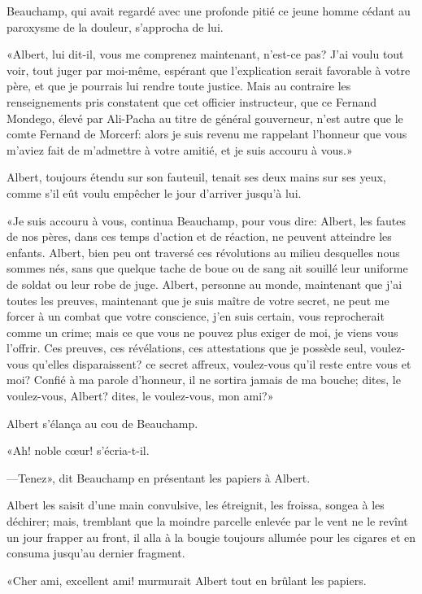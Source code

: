 Beauchamp, qui avait regardé avec une profonde pitié ce jeune homme cédant au paroxysme de la douleur, s'approcha de lui. 

«Albert, lui dit-il, vous me comprenez maintenant, n'est-ce pas? J'ai voulu tout voir, tout juger par moi-même, espérant que l'explication serait favorable à votre père, et que je pourrais lui rendre toute justice. Mais au contraire les renseignements pris constatent que cet officier instructeur, que ce Fernand Mondego, élevé par Ali-Pacha au titre de général gouverneur, n'est autre que le comte Fernand de Morcerf: alors je suis revenu me rappelant l'honneur que vous m'aviez fait de m'admettre à votre amitié, et je suis accouru à vous.» 

Albert, toujours étendu sur son fauteuil, tenait ses deux mains sur ses yeux, comme s'il eût voulu empêcher le jour d'arriver jusqu'à lui. 

«Je suis accouru à vous, continua Beauchamp, pour vous dire: Albert, les fautes de nos pères, dans ces temps d'action et de réaction, ne peuvent atteindre les enfants. Albert, bien peu ont traversé ces révolutions au milieu desquelles nous sommes nés, sans que quelque tache de boue ou de sang ait souillé leur uniforme de soldat ou leur robe de juge. Albert, personne au monde, maintenant que j'ai toutes les preuves, maintenant que je suis maître de votre secret, ne peut me forcer à un combat que votre conscience, j'en suis certain, vous reprocherait comme un crime; mais ce que vous ne pouvez plus exiger de moi, je viens vous l'offrir. Ces preuves, ces révélations, ces attestations que je possède seul, voulez-vous qu'elles disparaissent? ce secret affreux, voulez-vous qu'il reste entre vous et moi? Confié à ma parole d'honneur, il ne sortira jamais de ma bouche; dites, le voulez-vous, Albert? dites, le voulez-vous, mon ami?» 

Albert s'élança au cou de Beauchamp. 

«Ah! noble cœur! s'écria-t-il. 

—Tenez», dit Beauchamp en présentant les papiers à Albert. 

Albert les saisit d'une main convulsive, les étreignit, les froissa, songea à les déchirer; mais, tremblant que la moindre parcelle enlevée par le vent ne le revînt un jour frapper au front, il alla à la bougie toujours allumée pour les cigares et en consuma jusqu'au dernier fragment. 

«Cher ami, excellent ami! murmurait Albert tout en brûlant les papiers. 

